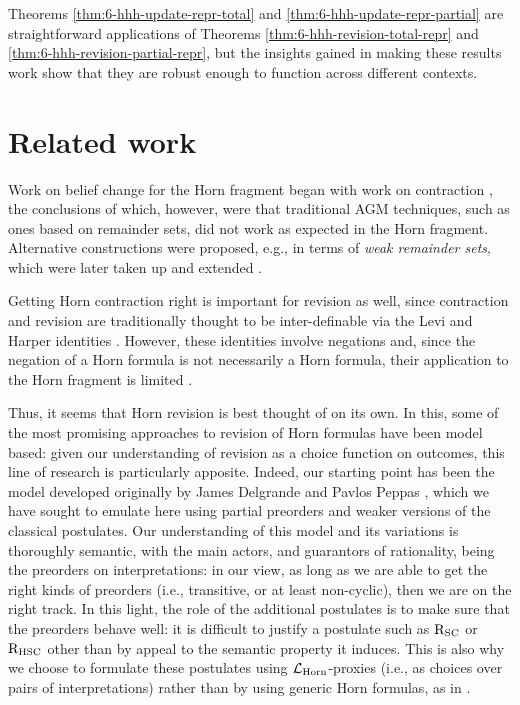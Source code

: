 Theorems \ref{thm:6-hhh-update-repr-total} and \ref{thm:6-hhh-update-repr-partial}
are straightforward applications of Theorems \ref{thm:6-hhh-revision-total-repr} 
and \ref{thm:6-hhh-revision-partial-repr}, but the insights gained in making these results 
work show that they are robust enough to function across different contexts.


























\section{Related work}\label{sec:6-rw}
Work on belief change for the Horn fragment began with 
work on contraction \cite{Delgrande08,DelgrandeW10,DelgrandeW13}, 
the conclusions of which, however, were that traditional AGM techniques,
such as ones based on remainder sets, did not work as expected
in the Horn fragment. Alternative constructions were proposed,
e.g., in terms of \emph{weak remainder sets}, which were later taken 
up and extended \cite{BoothMV09,BoothMVW11,ZhuangP14}.

Getting Horn contraction right is important for revision as well,
since contraction and revision are traditionally thought to be inter-definable
via the Levi and Harper identities \cite{Levi91,Harper76}.
However, these identities involve negations and, since the negation of a Horn formula
is not necessarily a Horn formula, their application to the Horn fragment is limited
\cite{Delgrande08,ZhuangPZ13,ZhuangPZ17}.

Thus, it seems that Horn revision is best thought of on its own.
In this, some of the most promising approaches to revision of Horn formulas 
have been model based: given our understanding of revision 
as a choice function on outcomes, this line of research is particularly apposite.
Indeed, our starting point has been the model developed originally 
by James Delgrande and Pavlos Peppas \cite{DelgrandeP15,DelgrandePW18},
which we have sought to emulate here using 
partial preorders and weaker versions of the classical postulates.
Our understanding of this model and its variations is thoroughly semantic, with the main 
actors, and guarantors of rationality, being the preorders on interpretations:
in our view, as long as we are able to get the right kinds of preorders 
(i.e., transitive, or at least non-cyclic), then we are on the right track.
In this light, the role of the additional postulates is to make sure 
that the preorders behave well: it is difficult to justify a postulate 
such as $\mathrm{R}_{{\mathrm{SC}}}$ or $\mathrm{R}_{{\mathrm{HSC}}}$ other than by appeal to the 
semantic property it induces. This is also why we choose to 
formulate these postulates using $\mathcal{L}_{\mathrm{Horn}}$-proxies 
(i.e., as choices over pairs of interpretations)
rather than by using generic Horn formulas, as in \cite{DelgrandeP15,DelgrandePW18}.

